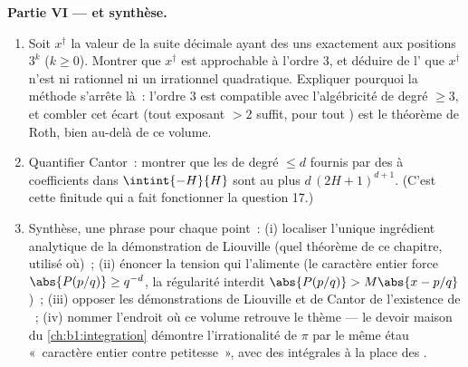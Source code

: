 \begin{problem}
\medskip
\noindent\textbf{Partie VI ---  et synthèse.}
\begin{enumerate}[resume]
  \item Soit $x^\dagger$ la valeur de la suite décimale ayant des
        uns exactement aux positions $3^k$ ($k \geq 0$). Montrer
        que $x^\dagger$ est approchable à l'ordre $3$, et déduire
        de l' que $x^\dagger$ n'est ni
        rationnel ni un irrationnel quadratique. Expliquer pourquoi la
        méthode s'arrête là~: l'ordre $3$ est compatible avec
        l'algébricité de degré $\geq 3$, et combler cet écart
        (tout exposant $> 2$ suffit, pour tout )
        est le théorème de Roth, bien au-delà de ce volume.
  \item Quantifier Cantor~: montrer que les  de
        degré $\leq d$ fournis par des  à coefficients
        dans $\intint{-H}{H}$ sont au plus $d\,(2H + 1)^{d+1}$.
        (C'est cette finitude qui a fait fonctionner la question 17.)
  \item Synthèse, une phrase pour chaque point~: (i) localiser l'unique
        ingrédient analytique de la démonstration de Liouville (quel théorème
        de ce chapitre, utilisé où)~; (ii) énoncer la tension
        qui l'alimente (le caractère entier force $\abs{P(p/q)} \geq
        q^{-d}$, la régularité interdit $\abs{P(p/q)} > M\abs{x -
        p/q}$)~; (iii) opposer les démonstrations de Liouville et de Cantor
        de l'existence de ~; (iv) nommer
        l'endroit où ce volume retrouve le thème --- le devoir
        maison du \cref{ch:b1:integration} démontre l'irrationalité de $\pi$
        par le même étau «~caractère entier contre petitesse~»,
        avec des intégrales à la place des .
\end{enumerate}
\end{problem}
